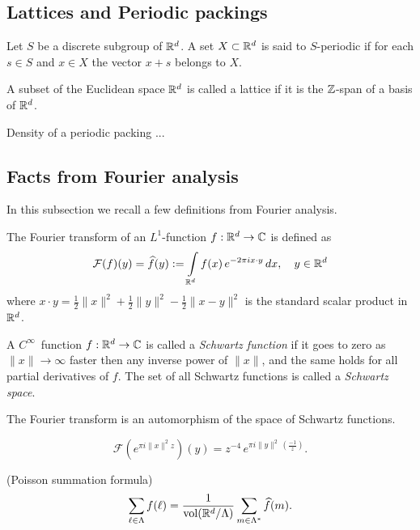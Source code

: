 \subsection{Lattices and Periodic packings}
\begin{definition}\label{def: Periodicity}
  Let $S$ be a discrete subgroup of $\mathbb{R}^d$. A set $X\subset\mathbb{R}^d$ is said to $S$-periodic if for each $s\in S$ and $x\in X$ the vector $x+s$ belongs to $X$.
\end{definition}

\begin{definition}\label{EuclideanLattice.is_lattice}\leanok
  A subset of the Euclidean space $\mathbb{R}^d$ is called a lattice if it is the $\mathbb{Z}$-span of a basis of $\mathbb{R}^d$.
\end{definition}

\begin{lemma}\label{def: Density of periodic packing} \notready
  Density of a periodic packing ...
\end{lemma}
\subsection{Facts from Fourier analysis}

In this subsection we recall a few definitions from Fourier analysis.
\begin{definition}\label{def: Fourier Transform definition} %
The Fourier transform of an $L^1$-function $f:\mathbb{R}^d\to\mathbb{C}$ is defined as
$$\mathcal{F}(f)(y)=\widehat{f}(y):=\int\limits_{\mathbb{R}^d} f(x)\,e^{-2\pi i x\cdot y}\,dx,\quad y\in\mathbb{R}^d $$
where $x\cdot y=\frac12\|x\|^2+\frac12\|y\|^2-\frac12\|x-y\|^2$ is the standard scalar product in $\mathbb{R}^d$.
\end{definition}
\begin{definition}
A $C^\infty$~function $f:\mathbb{R}^d\to\mathbb{C}$ is called a \emph{Schwartz function} if it goes to zero as $\|x\|\to\infty$ faster then any inverse power of $\|x\|$, and the same holds for all partial derivatives of $f$. The set of all Schwartz functions is called a \emph{Schwartz space}.
\end{definition}
\begin{lemma}\label{lemma: Fourier transform is automorphism}
  The Fourier transform is an automorphism of the space of Schwartz functions.
\end{lemma}
\begin{lemma}\label{lemma: Gaussian Fourier}
\begin{equation}\mathcal{F}(e^{\pi i  \|x\|^2 z})(y)=z^{-4}\,e^{\pi i \|y\|^2 \,(\frac{-1}{z}) }.\end{equation}
\end{lemma}
\begin{theorem}\label{thm: Poisson summation formula}
  (Poisson summation formula)$$\sum_{\ell\in\Lambda}f(\ell)=\frac{1}{\mathrm{vol}(\mathbb{R}^d/\Lambda)}\sum_{m\in\Lambda^*}\widehat{f}(m).$$
\end{theorem}

